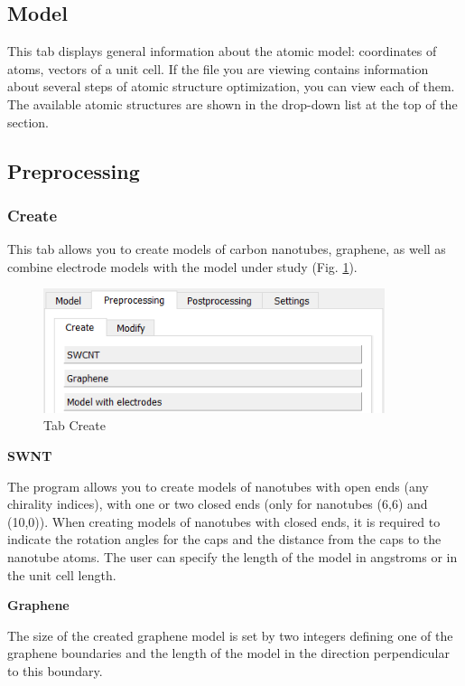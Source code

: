 \documentclass{article}
\begin{document}
\subsection{Model}

This tab displays general information about the atomic model: coordinates of atoms, vectors of a unit cell. If the file you are viewing contains information about several steps of atomic structure optimization, you can view each of them. The available atomic structures are shown in the drop-down list at the top of the section.

\subsection{Preprocessing}
\subsubsection{Create}

This tab allows you to create models of carbon nanotubes, graphene, as well as combine electrode models with the model under study (Fig. \ref{fig:precreate}).

\begin{figure}[h!]
	\centering
	\includegraphics[width=10.0cm]{precreate}
	\caption{Tab Create}
	\label{fig:precreate}
\end{figure}

\textbf{SWNT}

The program allows you to create models of nanotubes with open ends (any chirality indices), with one or two closed ends (only for nanotubes (6,6) and (10,0)). When creating models of nanotubes with closed ends, it is required to indicate the rotation angles for the caps and the distance from the caps to the nanotube atoms. The user can specify the length of the model in angstroms or in the unit cell length.


\textbf{Graphene}

The size of the created graphene model is set by two integers defining one of the graphene boundaries and the length of the model in the direction perpendicular to this boundary.
\end{document}
